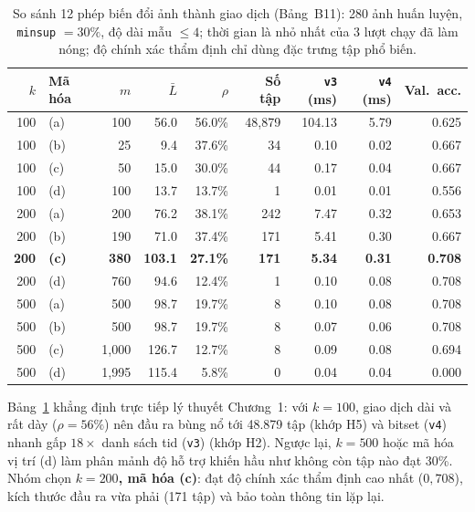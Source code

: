 \begin{table}[!t]
\centering
\caption{So sánh 12 phép biến đổi ảnh thành giao dịch (Bảng~B11): 280 ảnh huấn luyện, \texttt{minsup} $= 30\%$, độ dài mẫu $\le 4$; thời gian là nhỏ nhất của 3 lượt chạy đã làm nóng; độ chính xác thẩm định chỉ dùng đặc trưng tập phổ biến.}
\label{tab:b11_bovw_transform}
\scriptsize
\begin{tabular}{@{}rlrrrrrrr@{}}
\toprule
$k$ & Mã hóa & $m$ & $\bar{L}$ & $\rho$ & Số tập & \texttt{v3} (ms) & \texttt{v4} (ms) & Val.\ acc. \\
\midrule
100 & (a) & 100 & 56.0 & 56.0\% & 48,879 & 104.13 & 5.79 & 0.625 \\
100 & (b) & 25 & 9.4 & 37.6\% & 34 & 0.10 & 0.02 & 0.667 \\
100 & (c) & 50 & 15.0 & 30.0\% & 44 & 0.17 & 0.04 & 0.667 \\
100 & (d) & 100 & 13.7 & 13.7\% & 1 & 0.01 & 0.01 & 0.556 \\
200 & (a) & 200 & 76.2 & 38.1\% & 242 & 7.47 & 0.32 & 0.653 \\
200 & (b) & 190 & 71.0 & 37.4\% & 171 & 5.41 & 0.30 & 0.667 \\
\textbf{200} & \textbf{(c)} & \textbf{380} & \textbf{103.1} & \textbf{27.1\%} & \textbf{171} & \textbf{5.34} & \textbf{0.31} & \textbf{0.708} \\
200 & (d) & 760 & 94.6 & 12.4\% & 1 & 0.10 & 0.08 & 0.708 \\
500 & (a) & 500 & 98.7 & 19.7\% & 8 & 0.10 & 0.08 & 0.708 \\
500 & (b) & 500 & 98.7 & 19.7\% & 8 & 0.07 & 0.06 & 0.708 \\
500 & (c) & 1,000 & 126.7 & 12.7\% & 8 & 0.09 & 0.08 & 0.694 \\
500 & (d) & 1,995 & 115.4 & 5.8\% & 0 & 0.04 & 0.04 & 0.000 \\
\bottomrule
\end{tabular}
\end{table}

Bảng~\ref{tab:b11_bovw_transform} khẳng định trực tiếp lý thuyết Chương~1: với $k = 100$, giao dịch dài và rất dày ($\rho = 56\%$) nên đầu ra bùng nổ tới 48.879 tập (khớp H5) và bitset (\texttt{v4}) nhanh gấp $18\times$ danh sách tid (\texttt{v3}) (khớp H2). Ngược lại, $k = 500$ hoặc mã hóa vị trí (d) làm phân mảnh độ hỗ trợ khiến hầu như không còn tập nào đạt 30\%. Nhóm chọn \textbf{$k = 200$, mã hóa (c)}: đạt độ chính xác thẩm định cao nhất ($0{,}708$), kích thước đầu ra vừa phải (171 tập) và bảo toàn thông tin lặp lại.

